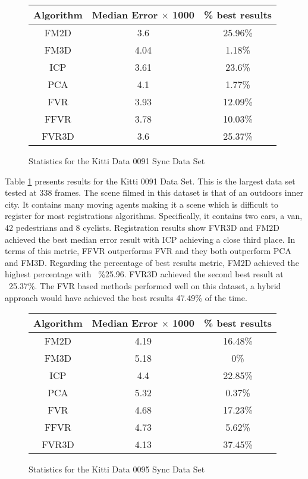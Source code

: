
\begin{figure}
\centering
\begin{tabular}{ccc}
\hline
\textbf{Algorithm} & \textbf{Median Error $\times$ 1000} & \textbf{\% best results}\\ \hline
FM2D	& 3.6 & 25.96\%\\
FM3D	& 4.04 & 1.18\%\\
ICP	& 3.61 & 23.6\%\\
PCA	& 4.1 & 1.77\%\\
FVR	& 3.93 & 12.09\%\\
FFVR	& 3.78 & 10.03\%\\
FVR3D	& 3.6 & 25.37\%\\
\end{tabular}
\caption{Statistics for the Kitti Data 0091 Sync Data Set}
\label{tab:kittidata0091sync}
\end{figure} 

Table \ref{tab:kittidata0091sync} presents results for the Kitti 0091 Data Set. This is the largest data set tested at 338 frames. The scene filmed in this dataset is that of an outdoors inner city. It contains many moving agents making it a scene which is difficult to register for most registrations algorithms. Specifically, it contains two cars, a van, 42 pedestrians and 8 cyclists. Registration results show FVR3D and FM2D achieved the best median error result with ICP achieving a close third place. In terms of this metric, FFVR outperforms FVR and they both outperform PCA and FM3D. Regarding the percentage of best results metric, FM2D achieved the highest percentage with ~\%25.96. FVR3D achieved the second best result at ~25.37\%. The FVR based methods performed well on this dataset, a hybrid approach would have achieved the best results 47.49\% of the time.  \\  	


\begin{figure}
\centering
\begin{tabular}{ccc}
\hline
\textbf{Algorithm} & \textbf{Median Error $\times$ 1000} & \textbf{\% best results}\\ \hline
FM2D	& 4.19 & 16.48\%\\
FM3D	& 5.18 & 0\%\\
ICP	& 4.4 & 22.85\%\\
PCA	& 5.32 & 0.37\%\\
FVR	& 4.68 & 17.23\%\\
FFVR	& 4.73 & 5.62\%\\
FVR3D	& 4.13 & 37.45\%\\
\end{tabular}
\caption{Statistics for the Kitti Data 0095 Sync Data Set}
\label{tab:kittidata0095sync}
\end{figure} 

